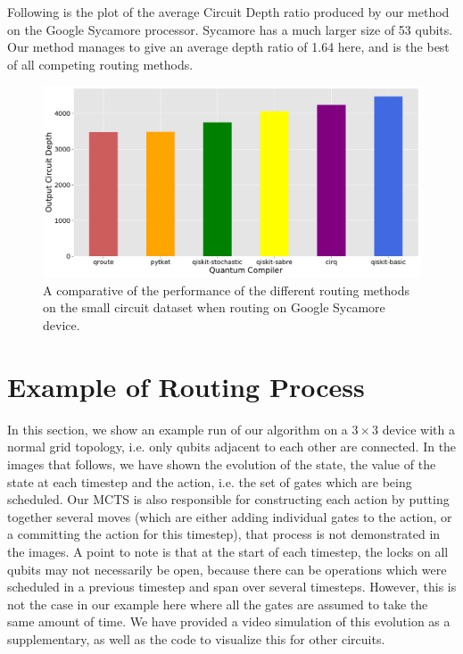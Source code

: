 Following is the plot of the average Circuit Depth ratio produced by our method on the Google Sycamore processor. Sycamore has a much larger size of 53 qubits. Our method manages to give an average depth ratio of 1.64 here, and is the best of all competing routing methods.

\begin{figure}[ht]
    \centering
    \includegraphics[width=\linewidth]{figures/qroute/sycamore.pdf}
    \caption[qRoute Results on Google Sycamore for small realistic circuits]{\label{fig:supp-sycamore-results}A comparative of the performance of the different routing methods on the small circuit dataset when routing on Google Sycamore device.}
\end{figure}

\onecolumn

\section{Example of Routing Process}

In this section, we show an example run of our algorithm on a $3 \times 3$ device with a normal grid topology, i.e. only qubits adjacent to each other are connected. In the images that follows, we have shown the evolution of the state, the value of the state at each timestep and the action, i.e. the set of gates which are being scheduled. Our MCTS is also responsible for constructing each action by putting together several moves (which are either adding individual gates to the action, or a committing the action for this timestep), that process is not demonstrated in the images. A point to note is that at the start of each timestep, the locks on all qubits may not necessarily be open, because there can be operations which were scheduled in a previous timestep and span over several timesteps. However, this is not the case in our example here where all the gates are assumed to take the same amount of time. We have provided a video simulation of this evolution as a supplementary, as well as the code to visualize this for other circuits.

